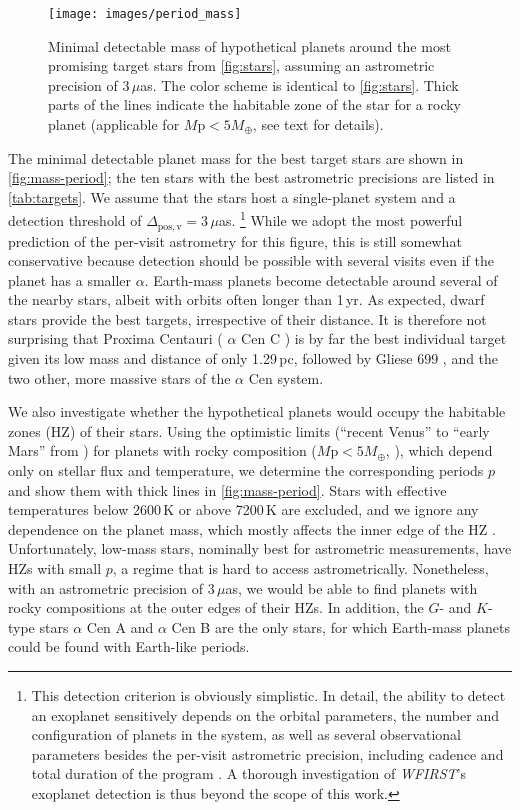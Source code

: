 \documentclass[modern, times]{aastex61}
\newcommand\wfirst{\textit{WFIRST}}
\DeclareRobustCommand{\object}[1]{%
   #1%
}
\begin{document}
\begin{figure}[t]
\centering\texttt{[image: images/period\_mass]}
\caption{Minimal detectable mass of hypothetical planets around the most promising target stars from \autoref{fig:stars}, assuming an astrometric precision of 3\,$\mu$as.
The color scheme is identical to \autoref{fig:stars}.
Thick parts of the lines indicate the habitable zone of the star for a rocky planet (applicable for $M\mathrm{p}<5M_\oplus$, see text for details).}
\label{fig:mass-period}
\end{figure}

The minimal detectable planet mass for the best target stars are shown in \autoref{fig:mass-period}; the ten stars with the best astrometric precisions are listed in \autoref{tab:targets}.
We assume that the stars host a single-planet system and a detection threshold of $\Delta_\mathrm{pos,v}=3\,\mu$as.%
\footnote{This detection criterion is obviously simplistic. In detail, the ability to detect an exoplanet sensitively depends on the orbital parameters, the number and configuration of planets in the system, as well as several observational parameters besides the per-visit astrometric precision, including cadence and total duration of the program \citep{Casertano2008, Perryman2014}. A thorough investigation of \wfirst's exoplanet detection is thus beyond the scope of this work.}
While we adopt the most powerful prediction of the per-visit astrometry for this figure, this is still somewhat conservative because detection should be possible with several visits even if the planet has a smaller $\alpha$. 
Earth-mass planets become detectable around several of the nearby stars, albeit with orbits often longer than 1\,yr.
As expected, dwarf stars provide the best targets, irrespective of their distance.
It is therefore not surprising that \object{Proxima Centauri} (\object{$\alpha$ Cen C}) is by far the best individual target given its low mass and distance of only 1.29\,pc, followed by \object{Gliese 699}, and the two other, more massive stars of the \object{$\alpha$ Cen} system.

We also investigate whether the hypothetical planets would occupy the habitable zones (HZ) of their stars. 
Using the optimistic limits (``recent Venus'' to ``early Mars'' from \citealt{Kopparapu2013}) for planets with rocky composition ($M\mathrm{p}<5M_\oplus$, \citealt{Seager2010}), which depend only on stellar flux and temperature, we determine the corresponding periods $p$ and show them with thick lines in \autoref{fig:mass-period}.
Stars with effective temperatures below 2600\,K or above 7200\,K are excluded, and we ignore any dependence on the planet mass, which mostly affects the inner edge of the HZ \citep{Kopparapu2014}.
Unfortunately, low-mass stars, nominally best for astrometric measurements, have HZs with small $p$, a regime that is hard to access astrometrically.
Nonetheless, with an astrometric precision of $3\,\mu$as, we would  be able to find planets with rocky compositions at the outer edges of their HZs.
In addition, the $G$- and $K$-type stars \object{$\alpha$ Cen A} and \object{$\alpha$ Cen B} are the only stars, for which Earth-mass planets could be found with Earth-like periods. 
\end{document}
